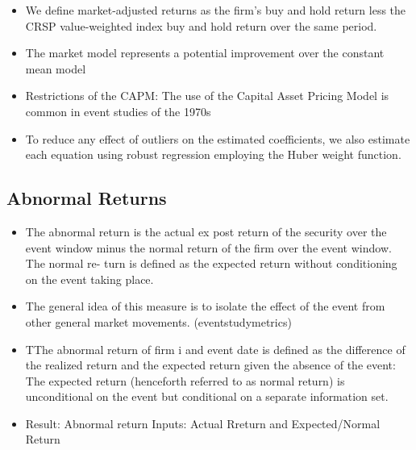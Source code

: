 \documentclass[12pt]{article}
\begin{document}
\begin{itemize}
        \item We define market-adjusted returns as the firm’s buy and hold return less the CRSP value-weighted index buy and hold return over the same period. \citep{Choi2012}

        \item The market model represents a potential improvement over the constant mean model \citep{MacKinlay1997}

        \item Restrictions of the CAPM: The use of the Capital Asset Pricing Model is common in event studies of the 1970s \citep{MacKinlay1997} 

        \item To reduce any effect of outliers on the estimated coefficients, we also estimate each equation using robust regression employing the Huber weight function. \citep{Brigida2012}

        
    \end{itemize}

\subsection{Abnormal Returns}

    \begin{itemize}
        \item The abnormal return is the actual ex post return of the security over the event window minus the normal return of the firm over the event window. The normal re- turn is defined as the expected return without conditioning on the event taking place. \citep{MacKinlay1997}

        \item The general idea of this measure is to isolate the effect of the event from other general market movements. (eventstudymetrics)

        \item TThe abnormal return of firm i and event date is defined as the difference of the realized return and the expected return given the absence of the event: The expected return (henceforth referred to as normal return) is unconditional on the event but conditional on a separate information set. 

        \item Result: Abnormal return Inputs: Actual Rreturn and Expected/Normal Return  
    \end{itemize}
\end{document}
